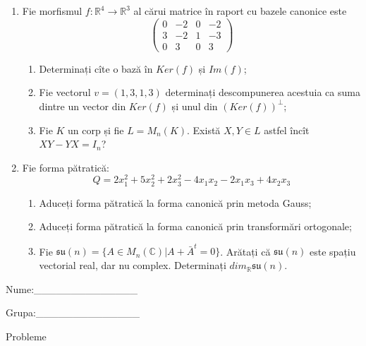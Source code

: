 \documentclass{article}
\begin{document}
\begin{enumerate}
 \item Fie morfismul $f:\mathbb{R}^4 \to \mathbb{R}^3$ al cărui matrice în raport cu bazele canonice este
$$\begin{pmatrix}
0&-2&0&-2\\
3&-2&1&-3\\
0&3&0&3
\end{pmatrix}$$

\begin{enumerate}
\item Determinați cîte o bază în $Ker(f)$ și $Im(f)$;
\item Fie vectorul $v=(1,3,1,3)$ determinați descompunerea acestuia ca suma dintre un vector din $Ker(f)$ și unul din $(Ker(f))^\perp$;
\item Fie $K$ un corp și fie $L=M_n(K)$. Există $X,Y \in L$ astfel încît $XY-YX=I_n$?  
\end{enumerate}
\item Fie forma pătratică:
$$Q= 2x_1^2+5x_2^2+2x_3^2-4x_1x_2-2x_1x_3+4x_2x_3$$

\begin{enumerate}
\item Aduceți forma pătratică la forma canonică prin metoda Gauss;
\item Aduceți forma pătratică la forma canonică prin transformări ortogonale;
\item Fie $\mathfrak{su}(n)=\{ A \in M_n(\mathbb{C}) | A+\bar{A}^t=0\}$. Arătați că $\mathfrak{su}(n)$ este spațiu vectorial real, dar nu complex.
Determinați $dim_{\mathbb{R}}\mathfrak{su}(n)$.
\end{enumerate}
\end{enumerate}
\newpage
\begin{flushright}
Nume:\_\_\_\_\_\_\_\_\_\_\_\_\_\_
 
 
Grupa:\_\_\_\_\_\_\_\_\_\_\_\_\_\_
\end{flushright}
\begin{center}
\vspace{2cm}
{\Large Probleme}
\vspace{2cm}
\end{center}
\end{document}
